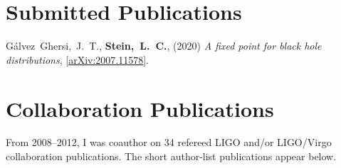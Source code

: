 \newcommand{\arxiv}[1]{[\href{http://arxiv.org/abs/#1}{arXiv:#1}]}
\newcommand{\citeCount}[1]{(#1 citations)}
\renewcommand{\citeCount}[1]{}


\setcounter{numPubs}{41}
\setcounter{pubCounter}{\value{numPubs}}


\section{\sc Submitted Publications}
\begin{etaremune}[start=\value{pubCounter}]
\item
  Gálvez~Ghersi,~J.~T.,
  {\bf Stein,~L.~C.},
  (2020)
  {\it A fixed point for black hole distributions},
  \arxiv{2007.11578}.
  \citeCount{0}
  \setcounter{pubCounter}{\value{enumi}}
\end{etaremune}


\section{\sc Collaboration Publications}
From 2008--2012, I was coauthor on 34 refereed LIGO and/or LIGO/Virgo
collaboration publications. The short author-list publications appear
below.

